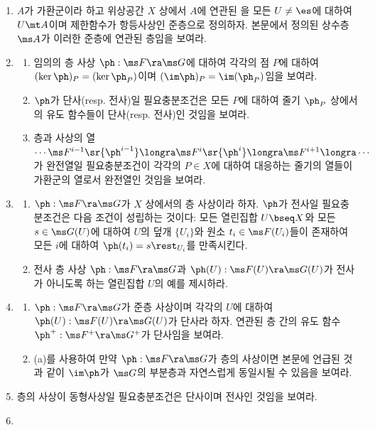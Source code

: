 	\begin{enumerate}[label=\tb{1.\arabic*.},itemindent=0mm,itemsep=2mm]
	\item $A$가 가환군이라 하고 위상공간 $X$ 상에서 $A$에 연관된 을
	모든 $U\ne\es$에 대하여 $U\mt A$이며 제한함수가 항등사상인 준층으로 정의하자.
	본문에서 정의된 상수층 $\ms A$가 이러한 준층에 연관된 층임을 보여라.
	\item \begin{enumerate}[label=(\alph*)]
	\item 임의의 층 사상 $\ph:\ms F\ra\ms G$에 대하여 각각의 점 $P$에 대하여
	$(\ker\ph)_P=(\ker\ph_P)$이며 $(\im\ph)_P=\im(\ph_P)$임을 보여라.
	\item $\ph$가 단사(resp. 전사)일 필요충분조건은 모든 $P$에 대하여
	줄기 $\ph_P$ 상에서의 유도 함수들이 단사(resp. 전사)인 것임을 보여라.
	\item 층과 사상의 열 $\cdots\ms F^{i-1}\sr{\ph^{i-1}}\longra\ms F^i\sr{\ph^i}\longra\ms F^{i+1}\longra\cdots$가 완전열일
	필요충분조건이 각각의 $P\in X$에 대하여 대응하는 줄기의 열들이 가환군의 열로서 완전열인 것임을 보여라.
	\end{enumerate}
	\item \begin{enumerate}[label=(\alph*)]
	\item $\ph:\ms F\ra\ms G$가 $X$ 상에서의 층 사상이라 하자. $\ph$가 전사일 필요충분조건은 다음 조건이 성립하는 것이다:
	모든 열린집합 $U\bseq X$와 모든 $s\in\ms G(U)$에 대하여 $U$의 덮개 $\{U_i\}$와 원소 $t_i\in\ms F(U_i)$들이 존재하여
	모든 $i$에 대하여 $\ph(t_i)=s\rest_{U_i}$를 만족시킨다.
	\item 전사 층 사상 $\ph:\ms F\ra\ms G$과 $\ph(U):\ms F(U)\ra\ms G(U)$가 전사가 아니도록 하는 열린집합 $U$의 예를 제시하라.
	\end{enumerate}
	\item \begin{enumerate}[label=(\alph*)]
	\item $\ph:\ms F\ra\ms G$가 준층 사상이며 각각의 $U$에 대하여 $\ph(U):\ms F(U)\ra\ms G(U)$가 단사라 하자.
	연관된 층 간의 유도 함수 $\ph^+:\ms F^+\ra\ms G^+$가 단사임을 보여라.
	\item (a)를 사용하여 만약 $\ph:\ms F\ra\ms G$가 층의 사상이면 본문에 언급된 것과 같이
	$\im\ph$가 $\ms G$의 부분층과 자연스럽게 동일시될 수 있음을 보여라.
	\end{enumerate}
	\item 층의 사상이 동형사상일 필요충분조건은 단사이며 전사인 것임을 보여라.
	\item \begin{enumerate}[label=(\alph*)]

\end{enumerate}
\end{enumerate}
